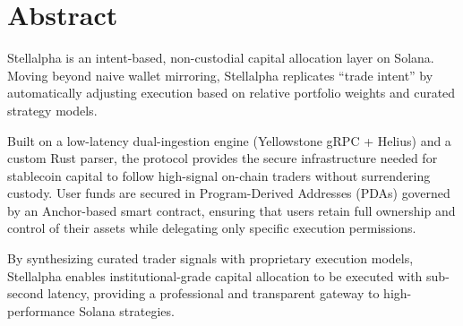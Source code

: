 \section*{Abstract}

Stellalpha is an intent-based, non-custodial capital allocation layer on Solana. Moving beyond naive wallet mirroring, Stellalpha replicates ``trade intent'' by automatically adjusting execution based on relative portfolio weights and curated strategy models. 

Built on a low-latency dual-ingestion engine (Yellowstone gRPC + Helius) and a custom Rust parser, the protocol provides the secure infrastructure needed for stablecoin capital to follow high-signal on-chain traders without surrendering custody. User funds are secured in Program-Derived Addresses (PDAs) governed by an Anchor-based smart contract, ensuring that users retain full ownership and control of their assets while delegating only specific execution permissions.

By synthesizing curated trader signals with proprietary execution models, Stellalpha enables institutional-grade capital allocation to be executed with sub-second latency, providing a professional and transparent gateway to high-performance Solana strategies.
